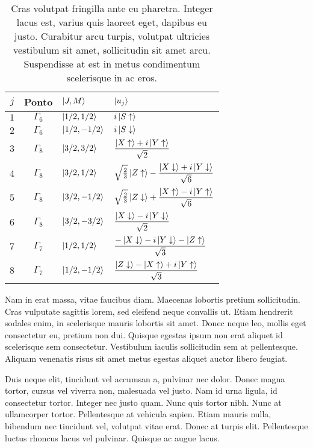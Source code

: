 \begin{table}[t]
 \caption[Um exemplo de uma tabela]{Cras volutpat fringilla ante eu pharetra. Integer lacus est, varius quis laoreet eget, dapibus eu justo. Curabitur arcu turpis, volutpat ultricies vestibulum sit amet, sollicitudin sit amet arcu. Suspendisse at est in metus condimentum scelerisque in ac eros.}
 \label{tab:autofuncoes}
\begin{center}
\begin{tabular}{ccll}
  \hline
  $j$  &  Ponto  & $\left| J, M \right\rangle$ & $\left| u_j \right\rangle$ \\ \hline
  $1$ & $\Gamma_6$ & $\left| 1/2, 1/2 \right\rangle$ & $i\left| S \uparrow \right\rangle$ \\
  $2$ & $\Gamma_6$ & $\left| 1/2, -1/2 \right\rangle$ & $i\left| S \downarrow \right\rangle$ \\
  $3$ & $\Gamma_8$ & $\left| 3/2, 3/2 \right\rangle$ & $\dfrac{\left| X\uparrow \right\rangle + i\left| Y\uparrow \right\rangle}{\sqrt{2}}$ \\
  $4$ & $\Gamma_8$ & $\left| 3/2, 1/2 \right\rangle$ & $\sqrt{\frac{2}{3}}\left| Z\uparrow \right\rangle - \dfrac{\left| X\downarrow \right\rangle + i\left| Y\downarrow \right\rangle}{\sqrt{6}}$ \\
  $5$ & $\Gamma_8$ & $\left| 3/2, -1/2 \right\rangle$ & $\sqrt{\frac{2}{3}}\left| Z\downarrow \right\rangle + \dfrac{\left| X\uparrow \right\rangle - i\left| Y\uparrow \right\rangle}{\sqrt{6}}$ \\
  $6$ & $\Gamma_8$ & $\left| 3/2, -3/2 \right\rangle$ & $\dfrac{\left| X\downarrow \right\rangle - i\left| Y\downarrow \right\rangle}{\sqrt{2}}$ \\
  $7$ & $\Gamma_7$ & $\left| 1/2, 1/2 \right\rangle$ & $ \dfrac{-\left| X\downarrow \right\rangle - i\left| Y\downarrow \right\rangle - \left| Z\uparrow \right\rangle}{\sqrt{3}}$ \\
  $8$ & $\Gamma_7$ & $\left| 1/2, -1/2 \right\rangle$ & $\dfrac{\left| Z\downarrow \right\rangle - \left| X\uparrow \right\rangle + i\left| Y\uparrow \right\rangle}{\sqrt{3}}$ \\
  \hline
\end{tabular}
\end{center}
\end{table}

Nam in erat massa, vitae faucibus diam. Maecenas lobortis pretium sollicitudin. Cras vulputate sagittis lorem, sed eleifend neque convallis ut. Etiam hendrerit sodales enim, in scelerisque mauris lobortis sit amet. Donec neque leo, mollis eget consectetur eu, pretium non dui. Quisque egestas ipsum non erat aliquet id scelerisque sem consectetur. Vestibulum iaculis sollicitudin sem at pellentesque. Aliquam venenatis risus sit amet metus egestas aliquet auctor libero feugiat.

Duis neque elit, tincidunt vel accumsan a, pulvinar nec dolor. Donec magna tortor, cursus vel viverra non, malesuada vel justo. Nam id urna ligula, id consectetur tortor. Integer nec justo quam. Nunc quis tortor nibh. Nunc at ullamcorper tortor. Pellentesque at vehicula sapien. Etiam mauris nulla, bibendum nec tincidunt vel, volutpat vitae erat. Donec at turpis elit. Pellentesque luctus rhoncus lacus vel pulvinar. Quisque ac augue lacus.